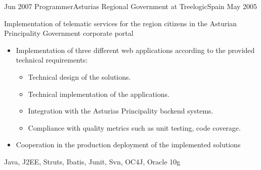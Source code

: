 \begin{experiences}
  
          
  \experience
  {Jun 2007}  {Programmer}{Asturias Regional Government at Treelogic}{Spain}
  {May 2005}   {
                      Implementation of  telematic services for the region citizens in the Asturian Principality Government corporate portal 
                      
                      \begin{itemize}

                        \item Implementation of three different web applications according to the provided technical requirements:
                         \begin{itemize}
                         	\item Technical design of the solutions.
                         	\item Technical implementation of the applications.
                        	\item Integration with the Asturias Principality backend systems.
                        	\item Compliance with quality metrics such as unit testing, code coverage.
                        \end{itemize}
                        
                        \item Cooperation in the production deployment of the implemented solutions

                      \end{itemize}
                  }
                  {Java, J2EE, Struts, Ibatis, Junit, Svn, OC4J, Oracle 10g} 
                   
\end{experiences}
